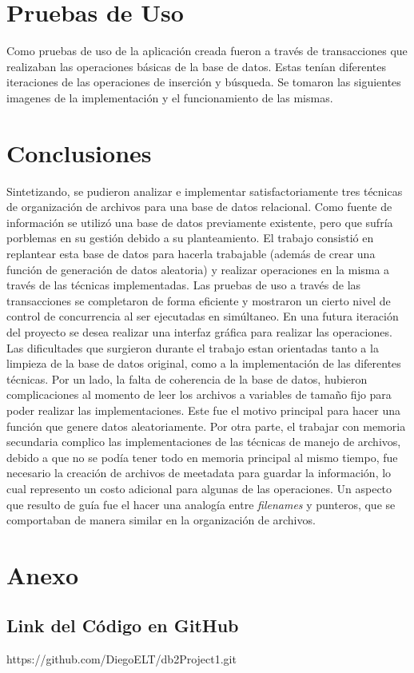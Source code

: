 \documentclass{article}
\begin{document}
  \section{Pruebas de Uso}

    Como pruebas de uso de la aplicación creada fueron a través de transacciones que realizaban las operaciones básicas de la base de datos. Estas tenían diferentes iteraciones de las operaciones de inserción y búsqueda. Se tomaron las siguientes imagenes de la implementación y el funcionamiento de las mismas.

  \section{Conclusiones}
    
    Sintetizando, se pudieron analizar e implementar satisfactoriamente tres técnicas de organización de archivos para una base de datos relacional. Como fuente de información se utilizó una base de datos previamente existente, pero que sufría porblemas en su gestión debido a su planteamiento. El trabajo consistió en replantear esta base de datos para hacerla trabajable (además de crear una función de generación de datos aleatoria) y realizar operaciones en la misma a través de las técnicas implementadas. Las pruebas de uso a través de las transacciones se completaron de forma eficiente y mostraron un cierto nivel de control de concurrencia al ser ejecutadas en simúltaneo. En una futura iteración del proyecto se desea realizar una interfaz gráfica para realizar las operaciones. \\

    Las dificultades que surgieron durante el trabajo estan orientadas tanto a la limpieza de la base de datos original, como a la implementación de las diferentes técnicas. Por un lado, la falta de coherencia de la base de datos, hubieron complicaciones al momento de leer los archivos a variables de tamaño fijo para poder realizar las implementaciones. Este fue el motivo principal para hacer una función que genere datos aleatoriamente. Por otra parte, el trabajar con memoria secundaria complico las implementaciones de las técnicas de manejo de archivos, debido a que no se podía tener todo en memoria principal al mismo tiempo, fue necesario la creación de archivos de meetadata para guardar la información, lo cual represento un costo adicional para algunas de las operaciones. Un aspecto que resulto de guía fue el hacer una analogía entre \textit{filenames} y punteros, que se comportaban de manera similar en la organización de archivos. 
  
  \section{Anexo}
    
    \subsection{Link del Código en GitHub}

      https://github.com/DiegoELT/db2Project1.git
\end{document}
